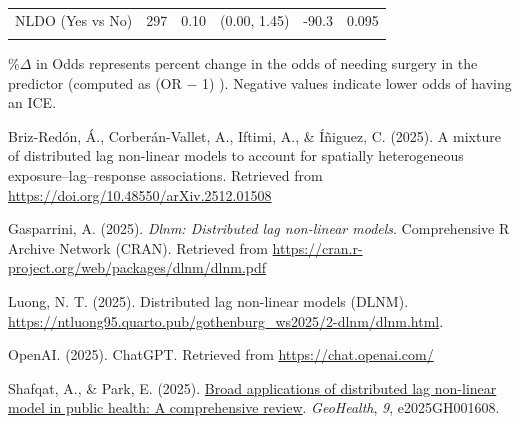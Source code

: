 \documentclass[
]{article}
\newlength{\cslhangindent}
\newenvironment{CSLReferences}[2] %
 {\begin{list}{}{%
  \setlength{\itemindent}{0pt}
  \setlength{\leftmargin}{0pt}
  \setlength{\parsep}{0pt}
  \ifodd #1
   \setlength{\leftmargin}{\cslhangindent}
   \setlength{\itemindent}{-1\cslhangindent}
  \fi
  \setlength{\itemsep}{#2\baselineskip}}}
 {\end{list}}
\begin{document}
\begin{table}[t]
\begin{tabular*}{0.85\linewidth}{@{\extracolsep{\fill}}lrrrrr}
NLDO (Yes vs No) & 297 & 0.10 & (0.00, 1.45) & -90.3 & 0.095 \\ 
{\cellcolor[HTML]{FFF3CD}{SPA (Yes vs No)}} & {\cellcolor[HTML]{FFF3CD}{297}} & {\cellcolor[HTML]{FFF3CD}{0.03}} & {\cellcolor[HTML]{FFF3CD}{(0.00, 0.23)}} & {\cellcolor[HTML]{FFF3CD}{-97.1}} & {\cellcolor[HTML]{FFF3CD}{<0.001}} \\ 
\bottomrule
\end{tabular*}
\begin{minipage}{\linewidth}
\%\ensuremath{\Delta} in Odds represents percent change in the odds of needing surgery
    in the predictor (computed as (OR \ensuremath{-} 1) ). Negative values indicate lower
    odds of having an ICE.\\
\end{minipage}
\end{table}

\protect{}\label{refs}
\begin{CSLReferences}{1}{0}
Briz-Redón, Á., Corberán-Vallet, A., Iftimi, A., \& Íñiguez, C. (2025). A mixture of distributed lag non-linear models to account for spatially heterogeneous exposure--lag--response associations. Retrieved from \url{https://doi.org/10.48550/arXiv.2512.01508}

Gasparrini, A. (2025). \emph{Dlnm: Distributed lag non-linear models}. Comprehensive R Archive Network (CRAN). Retrieved from \url{https://cran.r-project.org/web/packages/dlnm/dlnm.pdf}

Luong, N. T. (2025). Distributed lag non-linear models (DLNM). \url{https://ntluong95.quarto.pub/gothenburg_ws2025/2-dlnm/dlnm.html}.

OpenAI. (2025). ChatGPT. Retrieved from \url{https://chat.openai.com/}

Shafqat, A., \& Park, E. (2025). \href{https://doi.org/10.1029/2025GH001608}{Broad applications of distributed lag non-linear model in public health: A comprehensive review}. \emph{GeoHealth}, \emph{9}, e2025GH001608.

\end{CSLReferences}
\end{document}
